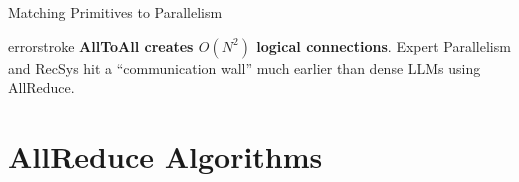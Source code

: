 \documentclass[aspectratio=169, 12pt]{beamer}
\begin{document}
\begin{frame}{Matching Primitives to Parallelism}
\vspace{0.15cm}
\begin{mlsyscard}{errorstroke}
{\footnotesize \textbf{AllToAll creates $O(N^2)$ logical connections}. Expert Parallelism and RecSys hit a ``communication wall'' much earlier than dense LLMs using AllReduce.}
\end{mlsyscard}

\end{frame}

\section{AllReduce Algorithms}
\end{document}
